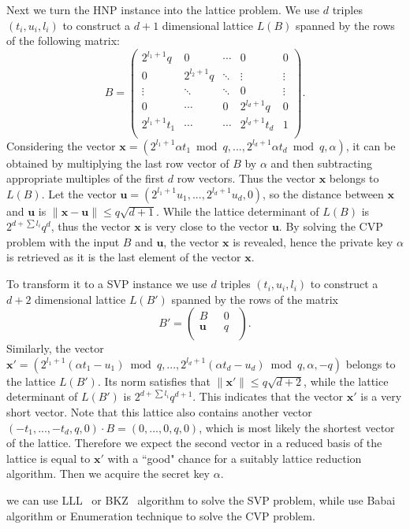 Next we turn the HNP instance into the lattice problem.
We use $d$ triples $(t_i, u_i, l_i)$ to construct a $d+1$ dimensional lattice $L(B)$ spanned by the rows of the following matrix:
$$B =
\left(
  \begin{array}{ccccc}
    2^{l_1+1}q & 0 & \cdots & 0 & 0 \\
    0 & 2^{l_2+1}q & \ddots & \vdots & \vdots \\
    \vdots & \ddots & \ddots & 0 & \vdots \\
    0 & \cdots & 0 & 2^{l_d+1}q & 0 \\
    2^{l_1+1}t_1 & \cdots & \cdots & 2^{l_d+1}t_d & 1 \\
  \end{array}
\right).
$$
Considering the vector $\textbf{x} = (2^{l_1+1}\alpha t_1 \bmod q, ..., 2^{l_d+1}\alpha t_d \bmod q, \alpha)$,
 it can be obtained by multiplying the last row vector of $B$ by $\alpha$ and then subtracting appropriate multiples of the first $d$ row vectors.
Thus the vector $\textbf{x}$ belongs to $L(B)$.
Let the vector $\textbf{u} = (2^{l_1+1}u_1, ..., 2^{l_d+1}u_d, 0)$,
 so the distance between $\textbf{x}$ and $\textbf{u}$ is $\|\textbf{x} - \textbf{u}\| \leq q\sqrt{d+1}$.
While the lattice determinant of $L(B)$ is $2^{d + \sum{l_i}}q^d$,
 thus the vector $\textbf{x}$ is very close to the vector $\textbf{u}$.
By solving the CVP problem with the input $B$ and $\textbf{u}$, the vector $\textbf{x}$ is revealed,
 hence the private key $\alpha$ is retrieved as it is the last element of the vector $\textbf{x}$.

To transform it to a SVP instance we use $d$ triples $(t_i, u_i, l_i)$ to construct a $d+2$ dimensional lattice $L(B')$ spanned by the rows of the matrix
$$B' =
\left(
  \begin{array}{cc}
     B\ \  &\  0\ \  \\
    \textbf{u}\ \ &\ q \ \  \\
  \end{array}
\right).
$$
Similarly, the vector $\textbf{x}' = (2^{l_1+1}(\alpha t_1 - u_1) \bmod q, ..., 2^{l_d+1}(\alpha t_d - u_d) \bmod q, \alpha, -q)$ belongs to the lattice $L(B')$.
 Its norm satisfies that $\|\textbf{x}'\| \leq q\sqrt{d+2}$,
  while the lattice determinant of $L(B')$ is $2^{d + \sum{l_i}}q^{d+1}$.
   This indicates that the vector $\textbf{x}'$ is a very short vector.
Note that this lattice also contains another vector $(-t_1, ..., -t_d, q, 0)\cdot B = (0, ..., 0, q, 0)$,
 which is most likely the shortest vector of the lattice.
Therefore we expect the second vector in a reduced basis of the lattice is equal to $\textbf{x}'$ with a ``good" chance for a suitably lattice reduction algorithm.
Then we acquire the secret key $\alpha$.

we can use LLL~\cite{Lenstra1982} or BKZ~\cite{Schnorr1994} algorithm to solve the SVP problem, while use Babai~\cite{Babai1986} algorithm or Enumeration technique to solve the CVP problem.


























